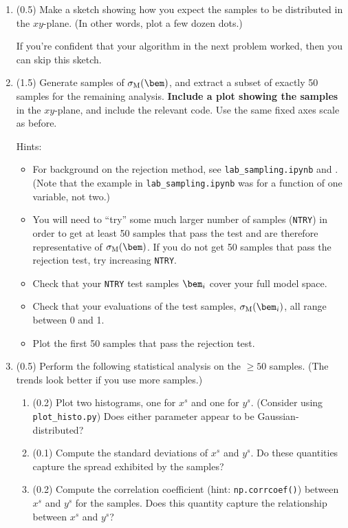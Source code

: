 \documentclass[11pt,titlepage,fleqn]{article}
\begin{document}
\begin{enumerate}
\item (0.5) Make a sketch showing how you expect the samples to be distributed in the $xy$-plane. (In other words, plot a few dozen dots.)

If you're confident that your algorithm in the next problem worked, then you can skip this sketch.

\item (1.5) Generate samples of $\sigma_{\rm M}(\bem)$, and extract a subset of exactly 50 samples for the remaining analysis.
{\bf Include a plot showing the samples} in the $xy$-plane, and include the relevant code.
Use the same fixed axes scale as before.

Hints:
%
\begin{itemize}
\item For background on the rejection method, see \verb+lab_sampling.ipynb+ and \citet[][Section~2.3.2]{Tarantola2005}. (Note that the example in \verb+lab_sampling.ipynb+ was for a function of one variable, not two.) 

\item You will need to ``try'' some much larger number of samples (\verb+NTRY+) in order to get at least 50 samples that pass the test and are therefore representative of $\sigma_{\rm M}(\bem)$. If you do not get 50 samples that pass the rejection test, try increasing \verb+NTRY+.

\item Check that your \verb+NTRY+ test samples $\bem_i$ cover your full model space.

\item Check that your evaluations of the test samples, $\sigma_{\rm M}(\bem_i)$, all range between 0 and 1.

\item Plot the first 50 samples that pass the rejection test.
\end{itemize}

\item (0.5) Perform the following statistical analysis on the $\ge50$ samples. (The trends look better if you use more samples.)
%
\begin{enumerate}
\item (0.2) Plot two histograms, one for $x^s$ and one for $y^s$. (Consider using \verb+plot_histo.py+)
Does either parameter appear to be Gaussian-distributed?

\item (0.1) Compute the standard deviations of $x^s$ and $y^s$.
Do these quantities capture the spread exhibited by the samples?

\item (0.2) Compute the correlation coefficient (hint: \verb+np.corrcoef()+) between $x^s$ and $y^s$ for the samples.
Does this quantity capture the relationship between $x^s$ and $y^s$?

\end{enumerate}

\end{enumerate}
\end{document}
